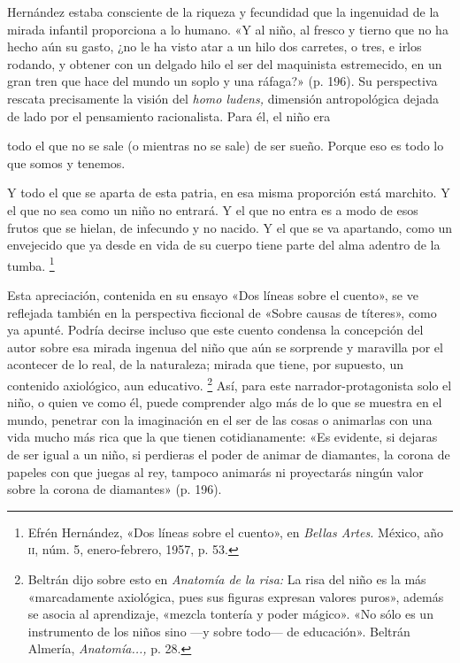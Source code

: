 \documentclass[14pt,twoside,final]{extbook} %
\let\oldfootnote\footnote
\renewcommand\footnote[1]{%
\oldfootnote{\hspace{1mm}#1}}
\begin{document}
Hernández estaba consciente de la riqueza y fecundidad que la ingenuidad de la mirada infantil proporciona a lo humano. «Y al niño, al fresco y tierno que no ha hecho aún su gasto, ¿no le ha visto atar a un hilo dos carretes, o tres, e irlos rodando, y obtener con un delgado hilo el ser del maquinista estremecido, en un gran tren que hace del mundo un soplo y una ráfaga?» (p. 196). Su perspectiva rescata precisamente la visión del \emph{homo ludens,} dimensión antropológica dejada de lado por el pensamiento racionalista. Para él, el niño era
\begin{quoting}
todo el que no se sale (o mientras no se sale) de ser sueño. Porque eso es todo lo que somos y tenemos.

Y todo el que se aparta de esta patria, en esa misma proporción está marchito. Y el que no sea como un niño no entrará. Y el que no entra es a modo de esos frutos que se hielan, de infecundo y no nacido. Y el que se va apartando, como un envejecido que ya desde en vida de su cuerpo tiene parte del alma adentro de la tumba.\footnote{Efrén Hernández, «Dos líneas sobre el cuento», en \emph{Bellas Artes.} México, año \textsc{ii}, núm. 5, enero-febrero, 1957, p. 53.}
\end{quoting}
Esta apreciación, contenida en su ensayo «Dos líneas sobre el cuento», se ve reflejada también en la perspectiva ficcional de «Sobre causas de títeres», como ya apunté. Podría decirse incluso que este cuento condensa la concepción del autor sobre esa mirada ingenua del niño que aún se sorprende y maravilla por el acontecer de lo real, de la naturaleza; mirada que tiene, por supuesto, un contenido axiológico, aun educativo.\footnote{Beltrán dijo sobre esto en \emph{Anatomía de la risa:} La risa del niño es la más «marcadamente axiológica, pues sus figuras expresan valores puros», además se asocia al aprendizaje, «mezcla tontería y poder mágico». «No sólo es un instrumento de los niños sino ---y sobre todo--- de educación». Beltrán Almería, \emph{Anatomía...,} p. 28.} Así, para este narrador-protagonista solo el niño, o quien ve como él, puede comprender algo más de lo que se muestra en el mundo, penetrar con la imaginación en el ser de las cosas o animarlas con una vida mucho más rica que la que tienen cotidianamente: «Es evidente, si dejaras de ser igual a un niño, si perdieras el poder de animar de diamantes, la corona de papeles con que juegas al rey, tampoco animarás ni proyectarás ningún valor sobre la corona de diamantes» (p. 196).
\end{document}
